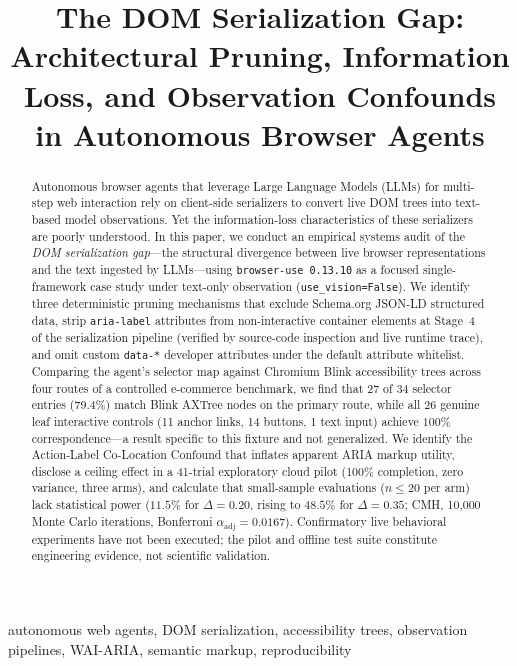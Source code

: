 \documentclass[conference]{IEEEtran}
\title{The DOM Serialization Gap: Architectural Pruning, Information Loss, and Observation Confounds in Autonomous Browser Agents}
\author{
  \IEEEauthorblockN{{[Author Name Placeholder]}}
  \IEEEauthorblockA{{[Department Placeholder]}\\
  {[Institution Placeholder]}\\
  {[email@placeholder.edu]}}
}
\begin{document}
\maketitle

\begin{abstract}
Autonomous browser agents that leverage Large Language Models (LLMs) for multi-step web interaction rely on client-side serializers to convert live DOM trees into text-based model observations. Yet the information-loss characteristics of these serializers are poorly understood. In this paper, we conduct an empirical systems audit of the \emph{DOM serialization gap}---the structural divergence between live browser representations and the text ingested by LLMs---using \texttt{browser-use 0.13.10} as a focused single-framework case study under text-only observation (\texttt{use\_vision=False}). We identify three deterministic pruning mechanisms that exclude Schema.org JSON-LD structured data, strip \texttt{aria-label} attributes from non-interactive container elements at Stage~4 of the serialization pipeline (verified by source-code inspection and live runtime trace), and omit custom \texttt{data-*} developer attributes under the default attribute whitelist. Comparing the agent's selector map against Chromium Blink accessibility trees across four routes of a controlled e-commerce benchmark, we find that 27 of 34 selector entries ($79.4\%$) match Blink AXTree nodes on the primary route, while all 26 genuine leaf interactive controls (11 anchor links, 14 buttons, 1 text input) achieve $100\%$ correspondence---a result specific to this fixture and not generalized. We identify the Action-Label Co-Location Confound that inflates apparent ARIA markup utility, disclose a ceiling effect in a 41-trial exploratory cloud pilot (100\% completion, zero variance, three arms), and calculate that small-sample evaluations ($n \le 20$ per arm) lack statistical power ($11.5\%$ for $\Delta = 0.20$, rising to $48.5\%$ for $\Delta = 0.35$; CMH, 10,000 Monte Carlo iterations, Bonferroni $\alpha_{\mathrm{adj}} = 0.0167$). Confirmatory live behavioral experiments have not been executed; the pilot and offline test suite constitute engineering evidence, not scientific validation.
\end{abstract}

\begin{IEEEkeywords}
autonomous web agents, DOM serialization, accessibility trees, observation pipelines, WAI-ARIA, semantic markup, reproducibility
\end{IEEEkeywords}
\end{document}
